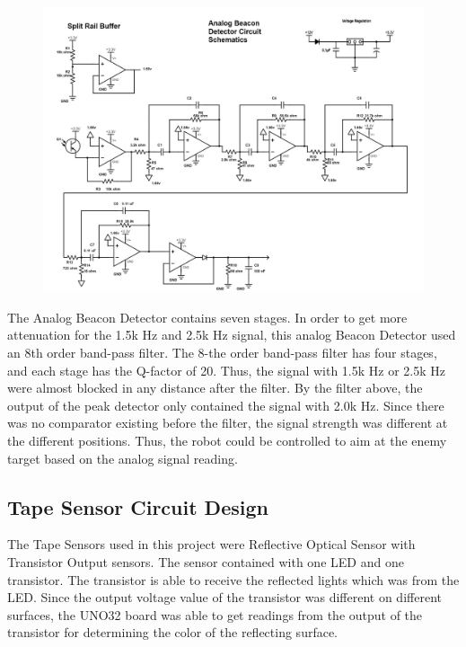 \documentclass{article}
\begin{document}
\begin{figure}[H]
    \centering
    \includegraphics[scale = 0.6]{Analog_Beacon_Detector_Schematics.jpg}
\end{figure}

The Analog Beacon Detector contains seven stages. In order to get more attenuation for the 1.5k Hz and 2.5k Hz signal, this analog Beacon Detector used an 8th order band-pass filter. The 8-the order band-pass filter has four stages, and each stage has the Q-factor of 20. Thus, the signal with 1.5k Hz or 2.5k Hz were almost blocked in any distance after the filter. By the filter above, the output of the peak detector only contained the signal with 2.0k Hz. Since there was no comparator existing before the filter, the signal strength was different at the different positions. Thus, the robot could be controlled to aim at the enemy target based on the analog signal reading.  

\subsection{Tape Sensor Circuit Design}
The Tape Sensors used in this project were Reflective Optical Sensor with Transistor Output sensors. The sensor contained with one LED and one transistor. The transistor is able to receive the reflected lights which was from the LED. Since the output voltage value of the transistor was different on different surfaces, the UNO32 board was able to get readings from the output of the transistor for determining the color of the reflecting surface.
\end{document}
